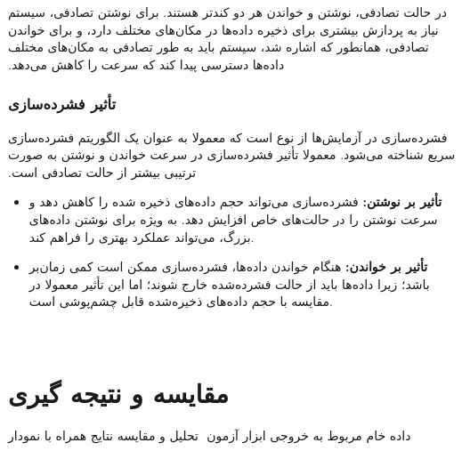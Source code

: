 ‫در حالت تصادفی، نوشتن و خواندن هر دو کندتر هستند. برای نوشتن تصادفی، سیستم نیاز به پردازش بیشتری برای ذخیره داده‌ها در مکان‌های مختلف دارد، و برای خواندن تصادفی، همانطور که اشاره شد، سیستم باید به طور تصادفی به مکان‌های مختلف داده‌ها دسترسی پیدا کند که سرعت را کاهش می‌دهد.
‫
‫\subsubsection*{تأثیر فشرده‌سازی}
‫فشرده‌سازی در آزمایش‌ها از نوع  است که معمولا به عنوان یک الگوریتم فشرده‌سازی سریع شناخته می‌شود. معمولا تأثیر فشرده‌سازی در سرعت خواندن و نوشتن به صورت ترتیبی بیشتر از حالت تصادفی است.
‫\begin{itemize}
‫    \item \textbf{تأثیر بر نوشتن:} فشرده‌سازی می‌تواند حجم داده‌های ذخیره شده را کاهش دهد و سرعت نوشتن را در حالت‌های خاص افزایش دهد. به ویژه برای نوشتن داده‌های بزرگ، می‌تواند عملکرد بهتری را فراهم کند.
‫    \item \textbf{تأثیر بر خواندن:} هنگام خواندن داده‌ها، فشرده‌سازی ممکن است کمی زمان‌بر باشد؛ زیرا داده‌ها باید از حالت فشرده‌شده خارج شوند؛ اما این تأثیر معمولا در مقایسه با حجم داده‌های ذخیره‌شده قابل چشم‌پوشی است.
‫\end{itemize}
‫
‫\section{مقایسه و نتیجه گیری}
‫
‫داده خام مربوط به خروجی ابزار آزمون
‫
‫تحلیل و مقایسه نتایج همراه با نمودار
‫
‫
‫
‫